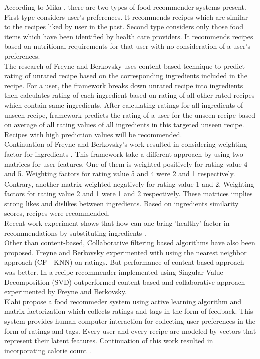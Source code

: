 \noindent According to Mika \cite{44}, there are two types of food recommender systems present. First type considers user's preferences. It recommends recipes which are similar to the recipes liked by user in the past. Second type considers only those food items which have been identified by health care providers. It recommends recipes based on nutritional requirements for that user with no consideration of a user's preferences.
\\
\noindent The research of Freyne and Berkovsky \cite{13} uses content based technique to predict rating of unrated recipe based on the corresponding ingredients included in the recipe. For a user, the framework breaks down unrated recipe into ingredients then calculates rating of each ingredient based on rating of all other rated recipes which contain same ingredients. After calculating ratings for all ingredients of unseen recipe, framework predicts the rating of a user for the unseen recipe based on average of all rating values of all ingredients in this targeted unseen recipe. Recipes with high prediction values will be recommended.
\\
\noindent Continuation of Freyne and Berkovsky's \cite{13} work resulted in considering weighting factor for ingredients \cite{15}. This framework take a different approach by using two matrices for user features. One of them is weighted positively for rating value 4 and 5. Weighting factors for rating value 5 and 4 were 2 and 1 respectively. Contrary, another matrix weighted negatively for rating value 1 and 2. Weighting factors for rating value 2 and 1 were 1 and 2 respectively. These matrices implies strong likes and dislikes between ingredients. Based on ingredients similarity scores, recipes were recommended.
\\
\noindent Recent work experiment shows that how can one bring 'healthy' factor in recommendations by substituting ingredients \cite{17}.
\\ 
\noindent Other than content-based, Collaborative filtering based algorithms have also been proposed. Freyne and Berkovsky experimented with using the nearest neighbor approach (CF - KNN) on ratings. But performance of content-based approach was better. In \cite{15} a recipe recommender implemented using Singular Value Decomposition (SVD) outperformed content-based and collaborative approach experimented by Freyne and Berkovsky.
\\
\noindent Elahi propose a food recommeder system using active learning algorithm and matrix factorization \cite{16} which collects ratings and tags in the form of feedback. This system provides human computer interaction for collecting user preferences in the form of ratings and tags. Every user and every recipe are modeled by vectors that represent their latent features. Continuation of this work resulted in incorporating calorie count \cite{18}. 
